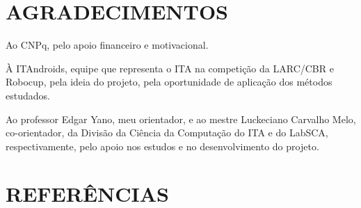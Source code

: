 \documentclass[10pt,fleqn,a4paper]{article}
\begin{document}
    \section{AGRADECIMENTOS}
    
	Ao CNPq, pelo apoio financeiro e motivacional.

	À ITAndroids, equipe que representa o ITA na competição da LARC/CBR e Robocup, pela ideia do projeto, pela oportunidade de aplicação dos métodos estudados.
	
	Ao professor Edgar Yano, meu orientador, e ao mestre Luckeciano Carvalho Melo, co-orientador, da Divisão da Ciência da Computação do ITA e do LabSCA, respectivamente, pelo apoio nos estudos e no desenvolvimento do projeto.


    \section{REFERÊNCIAS}
        
        

%
\end{document}
